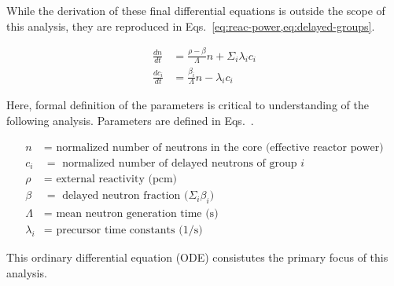 \documentclass[review,onefignum,onetabnum]{siamart171218}
\begin{document}
While the derivation of these final differential equations is outside the scope
of this analysis, they are reproduced in Eqs.~\cref{eq:reac-power,eq:delayed-groups}.

\begin{align}
  \label{eq:reac-power}
  \frac{dn}{dt} &= \frac{\rho - \beta}{\Lambda}n + \Sigma_i\lambda_i c_i \\
  \label{eq:delayed-groups}
  \frac{dc_i}{dt} &= \frac{\beta_i}{\Lambda}n - \lambda_i c_i
\end{align}

Here, formal definition of the parameters is critical to understanding of the
following analysis. Parameters are defined in Eqs.~.

\begin{align}
  \label{eq:param_1}
  n &= \text{ normalized number of neutrons in the core (effective reactor power)} \\
  \label{eq:param_2}
  c_i &= \text{ normalized number of delayed neutrons of group $i$} \\
  \label{eq:param_3}
  \rho &= \text{ external reactivity (pcm) } \\
  \label{eq:param_4}
  \beta &= \text{ delayed neutron fraction ($\Sigma_i \beta_i$) } \\
  \label{eq:param_5}
  \Lambda &= \text{ mean neutron generation time (s)} \\
  \label{eq:param_6}
  \lambda_i &= \text{ precursor time constants (1/s)}
\end{align}

This ordinary differential equation (ODE) consistutes the primary focus of this
analysis.
\end{document}
